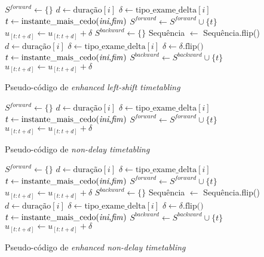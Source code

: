 \begin{algorithm}[H]
    $S^{\textit{forward}} \gets \{\}$\;
    {
        $d \gets \text{duração}[i]$\;
        $\delta \gets \text{tipo\_exame\_delta}[i]$\;
        $t \gets \text{instante\_mais\_cedo(\textit{ini},\textit{fim})}$\;
        $S^{\textit{forward}} \gets S^{\textit{forward}} \cup \{t\}$\;
        $u_{[t: t+d]} \gets u_{[t: t+d]} + \delta$\;
    }
    $S^{\textit{backward}} \gets \{\}$\;
    Sequência $\gets$ Sequência.flip()\;
	{
        $d \gets \text{duração}[i]$\;
        $\delta \gets \text{tipo\_exame\_delta}[i]$\;
        $\delta \gets \delta\text{.flip()}$\;
        $t \gets \text{instante\_mais\_cedo(\textit{ini},\textit{fim})}$\;
        $S^{\textit{backward}} \gets S^{\textit{backward}} \cup \{t\}$\;
        $u_{[t: t+d]} \gets u_{[t: t+d]} + \delta$\;
    }
    \caption{Pseudo-código de \textit{enhanced left-shift timetabling}}
    \label{algo:enh-left-shift-TT}
\end{algorithm}

\begin{algorithm}[H]
    $S^{\textit{forward}} \gets \{\}$\;
    {
        $d \gets \text{duração}[i]$\;
        $\delta \gets \text{tipo\_exame\_delta}[i]$\;
        $t \gets \text{instante\_mais\_cedo(\textit{ini},\textit{fim})}$\;
        $S^{\textit{forward}} \gets S^{\textit{forward}} \cup \{t\}$\;
        $u_{[t: t+d]} \gets u_{[t: t+d]} + \delta$\;
    }
    \caption{Pseudo-código de \textit{non-delay timetabling}}
    \label{algo:non-delay-TT}
\end{algorithm}

\begin{algorithm}[H]
    $S^{\textit{forward}} \gets \{\}$\;
    {
        $d \gets \text{duração}[i]$\;
        $\delta \gets \text{tipo\_exame\_delta}[i]$\;
        $t \gets \text{instante\_mais\_cedo(\textit{ini},\textit{fim})}$\;
        $S^{\textit{forward}} \gets S^{\textit{forward}} \cup \{t\}$\;
        $u_{[t: t+d]} \gets u_{[t: t+d]} + \delta$\;
    }
    $S^{\textit{backward}} \gets \{\}$\;
    Sequência $\gets$ Sequência.flip()\;
	{
        $d \gets \text{duração}[i]$\;
        $\delta \gets \text{tipo\_exame\_delta}[i]$\;
        $\delta \gets \delta\text{.flip()}$\;
        $t \gets \text{instante\_mais\_cedo(\textit{ini},\textit{fim})}$\;
        $S^{\textit{backward}} \gets S^{\textit{backward}} \cup \{t\}$\;
        $u_{[t: t+d]} \gets u_{[t: t+d]} + \delta$\;
    }
    \caption{Pseudo-código de \textit{enhanced non-delay timetabling}}
    \label{algo:enh-non-delay-TT}
\end{algorithm}

